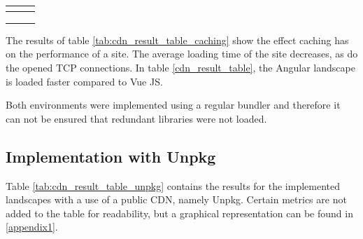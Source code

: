 \begin{longtable}[l]{*{3}{p{\mycolwidth}}}
	&  						   
	&    \\ \midrule
	
	&  						   
	&    \\ \midrule
	
	&  						   
	&    \\ \midrule
	
	&   				  
	&    \\ \bottomrule
	
\end{longtable}

The results of table \ref{tab:cdn_result_table_caching} show the effect caching has on the performance of a site. The average loading time of the site decreases, as do the opened TCP connections. In table \ref{cdn_result_table}, the Angular landscape is loaded faster compared to Vue JS.

Both environments were implemented using a regular bundler and therefore it can not be ensured that redundant libraries were not loaded.

\subsection{Implementation with Unpkg}

Table \ref{tab:cdn_result_table_unpkg} contains the results for the implemented landscapes with a use of a public CDN, namely Unpkg. Certain metrics are not added to the table for readability, but a graphical representation can be found in \ref{appendix1}. 

